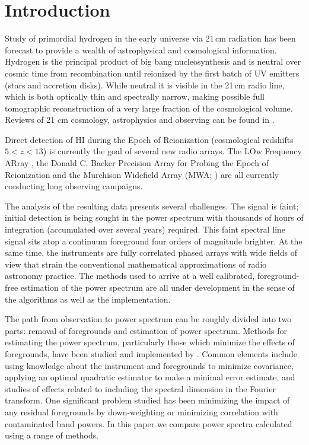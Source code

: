 \documentclass[twolcolumn]{emulateapj}
\begin{document}
\section{Introduction} 
  Study of primordial hydrogen  in the early universe via 21\,cm radiation has been forecast to provide a wealth of astrophysical and cosmological information.   Hydrogen is the principal product of big bang nucleosynthesis and is neutral over cosmic time from recombination until reionized by the first batch of UV emitters (stars and accretion disks). While neutral it is visible in the 21\,cm radio line, which is both optically thin and spectrally narrow, making possible full tomographic reconstruction of a very large fraction of the cosmological volume.  Reviews of 21 cm cosmology, astrophysics and observing can be found in \cite{Morales:2010p8093,Furlanetto:2006p2267,Pritchard:2012p9555,zaroubi2013epoch}.
  
Direct detection of HI during the Epoch of Reionization (cosmological redshifts $5<z<13$) is currently the goal of several new radio arrays. The LOw Frequency ARray \citep[LOFAR;][]{Yatawatta:2013p9699}, the Donald C. Backer Precision Array for Probing the Epoch of Reionization \citep[PAPER][]{Parsons:2014p10499} and the Murchison Widefield Array (MWA; \cite{Tingay:2013p9022,Bowman:2013p9950}) are all currently conducting long observing campaigns.



The analysis of the resulting data presents several challenges. The signal is faint; initial detection is being sought in the power spectrum with thousands of hours of integration (accumulated over several years) required. This faint spectral line signal sits atop a continuum foreground four orders of magnitude brighter. At the same time, the instruments are fully correlated phased arrays with wide fields of view that strain the conventional mathematical approximations of radio astronomy practice. The methods used to arrive at a well calibrated, foreground-free estimation of the power spectrum are all under development in the sense of the algorithms as well as the implementation.  


The path from observation to power spectrum can be roughly divided into two parts: removal of foregrounds and estimation of power spectrum. 
Methods for estimating the power spectrum, particularly those which minimize the effects of foregrounds, have been studied and implemented by \citet{Morales:2006p1870,Morales:2012p8790,Dillon:2013p10497,Dillon:2014p9788,Liu:2011p8763,Trott:2012p10466,2014PhRvD..90b3018L,2014PhRvD..90b3019L}. Common elements include using knowledge about the instrument and foregrounds to minimize covariance, applying an optimal quadratic estimator to make a minimal error estimate, and studies of effects related to including the spectral dimension in the Fourier transform.  One significant problem studied has been minimizing the impact of any residual foregrounds by down-weighting or minimizing correlation with contaminated band powers. In this paper we compare power spectra calculated using a range of methods. 
\end{document}

